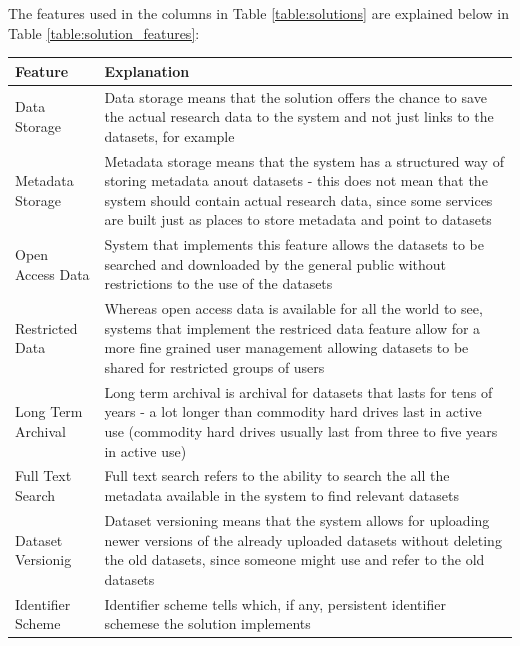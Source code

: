 The features used in the columns in Table \ref{table:solutions} are explained
below in Table \ref{table:solution_features}:


\label{table:solution_features}
    \begin{tabularx}{\textwidth}{| >{\raggedright}p{3cm} | X |}
    \hline
    \textbf{Feature} & \textbf{Explanation} \\
    \hline
    \rowcolor{Gray}
    Data Storage    & Data storage means that the solution offers the chance to
                      save the actual research data to the system and not just links
                      to the datasets, for example\\
    \hline
    Metadata Storage &  Metadata storage means that the system has a structured way
                        of storing metadata anout datasets - this does not mean that
                        the system should contain actual research data, since some services
                        are built just as places to store metadata and point to datasets\\
    \hline
    \rowcolor{Gray}
    Open Access Data    & System that implements this feature allows the datasets to be searched
                          and downloaded by the general public without restrictions to the use
                          of the datasets\\
    \hline
    Restricted Data    & Whereas open access data is available for all the world to see, systems
                         that implement the restriced data feature allow for a more fine grained
                         user management allowing datasets to be shared for restricted groups
                         of users\\
    \hline
    \rowcolor{Gray}
    Long Term Archival    & Long term archival is archival for datasets that lasts for tens of years -
                            a lot longer than commodity hard drives last in active use (commodity
                            hard drives usually last from three to five years in active use)\\
    \hline
    Full Text Search    & Full text search refers to the ability to search the all the metadata
                          available in the system to find relevant datasets\\
    \hline
    \rowcolor{Gray}
    Dataset Versionig    & Dataset versioning means that the system allows for uploading newer versions
                           of the already uploaded datasets without deleting the old datasets, since
                           someone might use and refer to the old datasets\\
    \hline
    Identifier Scheme    & Identifier scheme tells which, if any, persistent identifier schemese the
                           solution implements\\
    \hline
\end{tabularx}

